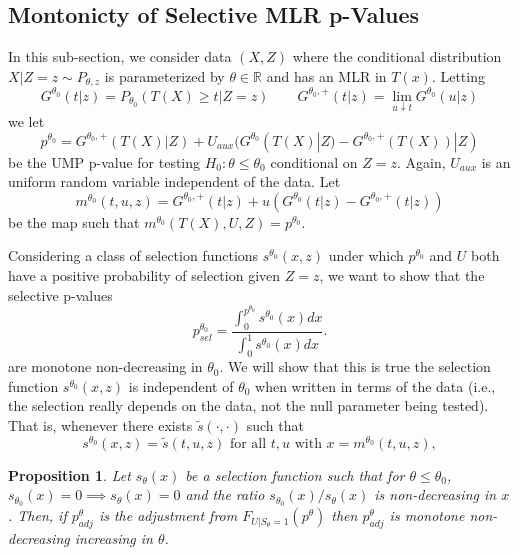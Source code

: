 \documentclass{article}
\newtheorem{proposition}{Proposition}
\newcommand{\R}{\mathbb{R}}
\begin{document}
\begin{appendix}
\subsection{Montonicty of Selective MLR p-Values}
\label{sec:one_sided_monotone_appdx}

In this sub-section, we consider data $(X, Z)$ where the conditional distribution $X | Z= z \sim P_{\theta, z}$ is parameterized by $\theta \in \R$ and has an MLR in $T(x)$. Letting
\begin{equation*}
    G^{\theta_0}(t |z) = P_{\theta_0}(T(X) \geq t | Z=z) \qquad G^{\theta_0, +}(t|z) = \lim_{u \downarrow t} G^{\theta_0}(u|z)
\end{equation*}
we let 
\begin{equation*}
    p^{\theta_0} = G^{\theta_0, +}(T(X) |Z) + U_{aux}(G^{\theta_0}(T(X)|Z) - G^{\theta_0, +}(T(X))|Z)
\end{equation*}
be the UMP p-value for testing $H_{0}: \theta \leq \theta_0$ conditional on $Z=z$. Again, $U_{aux}$ is an uniform random variable independent of the data. Let 
\begin{equation*}
    m^{\theta_0}(t, u, z) = G^{\theta_0, +}(t|z) + u(G^{\theta_0}(t|z) - G^{\theta_0, +}(t|z))
\end{equation*}
be the map such that $m^{\theta_0}(T(X), U, Z) = p^{\theta_0}$. 

Considering a class of selection functions $s^{\theta_0}(x, z)$ under which $p^{\theta_0}$  and $U$ both have a positive probability of selection given $Z=z$, we want to show that the selective p-values 
\begin{equation*}
    p^{\theta_0}_{sel} = \frac{\int_{0}^{p^{\theta_0}} s^{\theta_0}(x) dx}{\int_{0}^{1} s^{\theta_0}(x) dx}.
\end{equation*}
are monotone non-decreasing in $\theta_0$. We will show that this is true the selection function $s^{\theta_0}(x, z)$ is independent of $\theta_0$ when written in terms of the data (i.e., the selection really depends on the data, not the null parameter being tested). That is, whenever there exists $\tilde{s}(\cdot, \cdot)$ such that 
\begin{equation*}
    s^{\theta_0}(x, z) = \tilde{s}(t, u, z) \text{ for all } t, u \text{ with } x = m^{\theta_0}(t, u, z), 
\end{equation*}

\begin{proposition}
    \label{prop:monotone_adjustment}
    Let $s_{\theta}(x)$ be a selection function such that for $\theta \leq \theta_0$, $s_{\theta_0}(x)= 0 \implies s_{\theta}(x) = 0$ and the ratio $s_{\theta_0}(x)/s_{\theta}(x)$ is non-decreasing in $x$. Then, if $p^{\theta}_{adj}$ is the adjustment from $F_{U | S_{\theta} = 1}(p^{\theta})$ then $p^{\theta}_{adj}$ is monotone non-decreasing increasing in $\theta$.  


\end{proposition}
\end{appendix}
\end{document}
